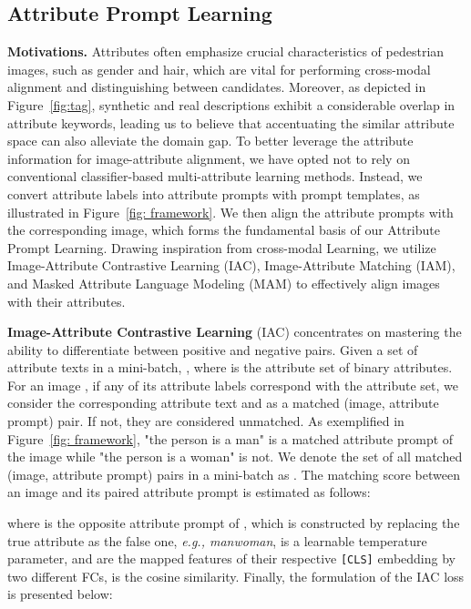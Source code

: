 \documentclass[sigconf]{acmart}
\begin{document}
\subsection{Attribute Prompt Learning }

\textbf{Motivations.}
Attributes often emphasize crucial characteristics of pedestrian images, such as gender and hair, which are vital for performing cross-modal alignment and distinguishing between candidates. 
Moreover, as depicted in Figure~\ref{fig:tag}, synthetic and real descriptions exhibit a considerable overlap in attribute keywords, leading us to believe that accentuating the similar attribute space can also alleviate the domain gap. 
To better leverage the attribute information for image-attribute alignment, we have opted not to rely on conventional classifier-based multi-attribute learning methods.
Instead, we convert attribute labels into attribute prompts with prompt templates, as illustrated in Figure~\ref{fig: framework}. 
We then align the attribute prompts with the corresponding image, which forms the fundamental basis of our Attribute Prompt Learning.
Drawing inspiration from cross-modal Learning, we utilize Image-Attribute Contrastive Learning (IAC), Image-Attribute Matching (IAM), and Masked Attribute Language Modeling (MAM) to effectively align images with their attributes.


\noindent\textbf{Image-Attribute Contrastive Learning} 
(IAC) concentrates on mastering the ability to differentiate between positive and negative pairs. 
Given a set of attribute texts  in a mini-batch, , where  is the attribute set of  binary attributes.
For an image , if any of its attribute labels correspond with the attribute set, we consider the corresponding attribute text and  as a matched (image, attribute prompt) pair. If not, they are considered unmatched. 
As exemplified in Figure~\ref{fig: framework}, "the person is a man" is a matched attribute prompt of the image while "the person is a woman" is not. We denote the set of all matched (image, attribute prompt) pairs in a mini-batch as .
The matching score between an image  and its paired attribute prompt  is estimated as follows:
\vspace{-.1in}

where  is the opposite attribute prompt of , {which is constructed by replacing the true attribute as the false one, \emph{e.g., manwoman}},  is a learnable temperature parameter,  and  are the mapped features of their respective \texttt{[CLS]} embedding by two different FCs,  is the cosine similarity. Finally,
the formulation of the IAC loss is presented below:
\vspace{-.1in}
\end{document}
